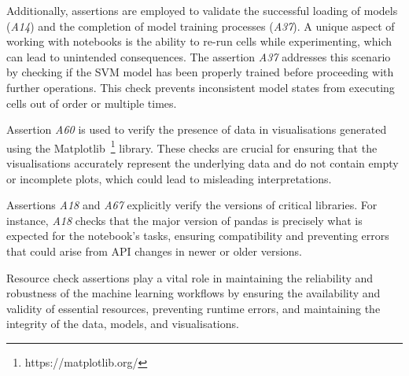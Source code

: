 Additionally, assertions are employed to validate the successful loading of models (\emph{A14}) and the completion of model training processes (\emph{A37}). A unique aspect of working with notebooks is the ability to re-run cells while experimenting, which can lead to unintended consequences. The assertion \emph{A37} addresses this scenario by checking if the SVM model has been properly trained before proceeding with further operations. This check prevents inconsistent model states from executing cells out of order or multiple times.

Assertion \emph{A60} is used to verify the presence of data in visualisations generated using the Matplotlib~\footnote{https://matplotlib.org/} library. These checks are crucial for ensuring that the visualisations accurately represent the underlying data and do not contain empty or incomplete plots, which could lead to misleading interpretations.

Assertions \emph{A18} and \emph{A67} explicitly verify the versions of critical libraries. For instance, \emph{A18} checks that the major version of pandas is precisely what is expected for the notebook’s tasks, ensuring compatibility and preventing errors that could arise from API changes in newer or older versions.

Resource check assertions play a vital role in maintaining the reliability and robustness of the machine learning workflows by ensuring the availability and validity of essential resources, preventing runtime errors, and maintaining the integrity of the data, models, and visualisations.




